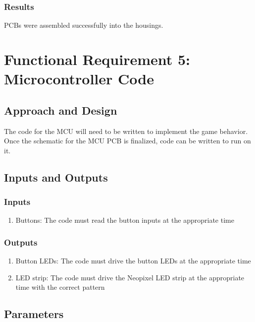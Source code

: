 \documentclass{notes}
\begin{document}
\subsubsection{Results}

PCBs were assembled successfully into the housings.

\section{Functional Requirement 5: Microcontroller Code}

\subsection{Approach and Design}

The code for the MCU will need to be written to implement the game behavior.
Once the schematic for the MCU PCB is finalized, code can be written to run on it.

\subsection{Inputs and Outputs}

\subsubsection{Inputs}

\begin{enumerate}
    \item Buttons: The code must read the button inputs at the appropriate time
\end{enumerate}

\subsubsection{Outputs}

\begin{enumerate}
    \item Button LEDs: The code must drive the button LEDs at the appropriate time
    \item LED strip: The code must drive the Neopixel LED strip at the appropriate time with the correct pattern
\end{enumerate}

\subsection{Parameters}
\end{document}
